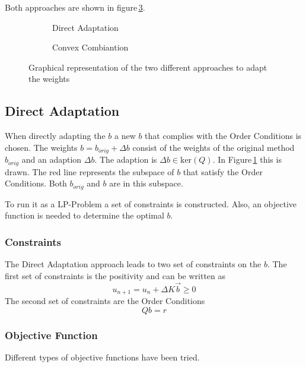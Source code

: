 \documentclass{article}
\begin{document}
Both approaches are shown in figure\,\ref{fig:b_space}.


\begin{figure}
    \centering
    \begin{subfigure}[b]{0.45\textwidth}
        
        \caption{Direct Adaptation}
        \label{fig:b_direct}
    \end{subfigure}
    \begin{subfigure}[b]{0.45\textwidth}
        
        \caption{Convex Combiantion}
        \label{fig:b_convex}
    \end{subfigure}
    \caption{Graphical representation of the two different approaches to adapt the weights}\label{fig:b_space}
\end{figure}

\subsection{Direct Adaptation}\label{sec:direct}

When directly adapting the $b$ a new $b$ that complies with the Order Conditions is chosen.   
The weights $b = b_{orig} + \Delta b$ consist of the weights of the original method $b_{orig}$ and an adaption $\Delta b$. The adaption is $\Delta b \in \mathrm{ker}(Q)$. 
In Figure\,\ref{fig:b_direct} this is drawn. The red line represents the subspace of $b$ that satisfy the Order Conditions. Both $b_{orig}$ and $b$ are in this subspace. 
 
To run it as a LP-Problem a set of constraints is constructed.  
Also, an objective function is needed to determine the optimal $b$.

\subsubsection{Constraints}
The Direct Adaptation approach leads to two set of constraints on the $b$.
The first set of constraints is the positivity and can be written as 
\begin{equation}
u_{n+1}=u_n+\Delta K \vec{b} \geq 0
\end{equation}
The second set of constraints are the Order Conditions
\begin{equation}
Qb=r
\end{equation}





\subsubsection{Objective Function}
Different types of objective functions have been tried. 
\end{document}
